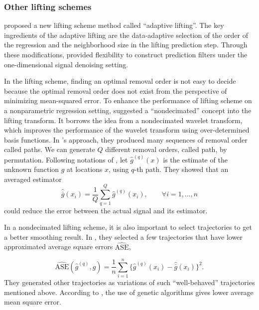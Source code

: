 \documentclass[11pt,titlepage]{article}
\begin{document}
\subsubsection{Other lifting schemes}\label{subsec:otherlifting}
\cite{Nunes2006} proposed a new lifting scheme method called ``adaptive lifting''. The key ingredients of the adaptive lifting are the data-adaptive selection of the order of the regression and the neighborhood size in the lifting prediction step. Through these modifications, \cite{Nunes2006} provided flexibility to construct prediction filters under the one-dimensional signal denoising setting.


In the lifting scheme, finding an optimal removal order is not easy to decide because the optimal removal order does not exist from the perspective of minimizing mean-squared error. To enhance the performance of lifting scheme on a nonparametric regression setting, \cite{Knight2009} suggested a ``nondecimated'' concept into the lifting transform. It borrows the idea from a nondecimated wavelet transform, which improves the performance of the wavelet transform using over-determined basis functions. In \cite{Knight2009}'s approach, they produced many sequences of removal order called paths. We can generate $Q$ different removal orders, called path, by permutation.  Following notations of \cite{Knight2009}, let $\hat{g}^{(q)}(x)$ is the estimate of the unknown function $g$ at locations $x$, using $q$-th path. They showed that an averaged estimator $$\hat{\bar{g}}(x_{i}) = \frac{1}{Q}\sum_{q=1}^{Q}\hat{g}^{(q)}(x_{i}), \qquad{\forall i = 1,\ldots , n}
$$
could reduce the error between the actual signal and its estimator.

In a nondecimated lifting scheme, it is also important to select trajectories to get a better smoothing result. In \cite{Knight2009}, they selected a few trajectories that have lower approximated average square errors $\widehat{\text{ASE}}$,

\[\widehat{\text{ASE}}(\hat{g}^{(q)},g) =\frac{1}{n}\sum_{i=1}^{n}\{ \hat{g}^{(q)}(x_i) -\hat{\bar{g}}(x_i) \}^{2}.
\]
They generated other trajectories as variations of such ``well-behaved'' trajectories mentioned above.
According to \cite{Knight2009}, the use of genetic algorithms gives lower average mean square error.
\end{document}
